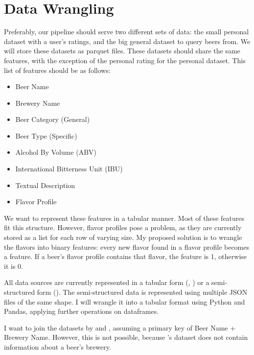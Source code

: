 \documentclass[sigconf, natbib=true]{acmart}
\begin{document}
\section{Data Wrangling}
Preferably, our pipeline should serve two different sets of data: the small personal dataset with a user's ratings, and the big general dataset to query beers from.
We will store these datasets as parquet files.
These datasets should share the same features, with the exception of the personal rating for the personal dataset.
This list of features should be as follows:
\begin{itemize}
    \item Beer Name
    \item Brewery Name
    \item Beer Category (General)
    \item Beer Type (Specific)
    \item Alcohol By Volume (ABV)
    \item International Bitterness Unit (IBU)
    \item Textual Description
    \item Flavor Profile
\end{itemize}
We want to represent these features in a tabular manner.
Most of these features fit this structure.
However, flavor profiles pose a problem, as they are currently stored as a list for each row of varying size.
My proposed solution is to wrangle the flavors into binary features: every new flavor found in a flavor profile becomes a feature.
If a beer's flavor profile contains that flavor, the feature is 1, otherwise it is 0.

All data sources are currently represented in a tabular form (\citeauthor{untappd}, \citeauthor{openbeerdb}) or a semi-structured form (\citeauthor{philipperemy}).
The semi-structured data is represented using multiple JSON files of the same shape.
I will wrangle it into a tabular format using Python and Pandas, applying further operations on dataframes.

I want to join the datasets by \citet{openbeerdb} and \citet{philipperemy}, assuming a primary key of Beer Name + Brewery Name.
However, this is not possible, because \citeauthor{philipperemy}'s dataset does not contain information about a beer's brewery.



\def\bibfont{\small} %
 
\end{document}
